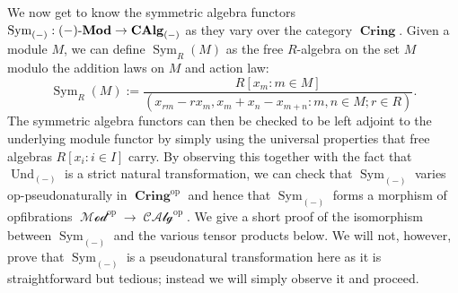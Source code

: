 \documentclass{amsart}
\theoremstyle{definition}
\DeclareMathOperator{\sym}{Sym}
\DeclareMathOperator{\Set}{\mathbf{Set}}
\DeclareMathOperator{\Cring}{\mathbf{Cring}}
\DeclareMathOperator{\Free}{Free}
\DeclareMathOperator{\Forget}{Forget}
\DeclareMathOperator{\op}{op}
\DeclareMathOperator{\MMod}{\mathcal{Mod}}
\DeclareMathOperator{\CCalg}{\mathcal{CAlg}}
\DeclareMathOperator{\und}{Und}
\newcommand{\CAlg}[1]{\mathbf{CAlg}_{#1}}
\newcommand{\Und}[1]{\und_{#1}}
\newcommand{\Sym}[1]{\sym_{#1}}
\newcommand{\Mod}[1]{{#1}\textnormal{-}\mathbf{Mod}}
\numberwithin{equation}{subsection}
\begin{document}
We now get to know the symmetric algebra functors $\Sym{(-)}:\Mod{(-)} \to \CAlg{(-)}$ as they vary over the category $\Cring$. Given a module $M$, we can define $\Sym{R}(M)$ as the free $R$-algebra on the set $M$ modulo the addition laws on $M$ and action law:
\[
\Sym{R}(M) := \frac{R[x_m:m \in M]}{(x_{rm} - rx_m, x_m + x_{n} - x_{m+n}: m, n \in M; r \in R)}.
\]
The symmetric algebra functors can then be checked to be left adjoint to the underlying module functor by simply using the universal properties that free algebras $R[x_i:i \in I]$ carry. By observing this together with the fact that $\Und{(-)}$ is a strict natural transformation, we can check that $\Sym{(-)}$ varies op-pseudonaturally in $\Cring^{\op}$ and hence that $\Sym{(-)}$ forms a morphism of opfibrations $\MMod^{\op} \to \CCalg^{\op}$. We give a short proof of the isomorphism between $\Sym{(-)}$ and the various tensor products below. We will not, however, prove that $\Sym{(-)}$ is a pseudonatural transformation here as it is straightforward but tedious; instead we will simply observe it and proceed.
%
\end{document}
